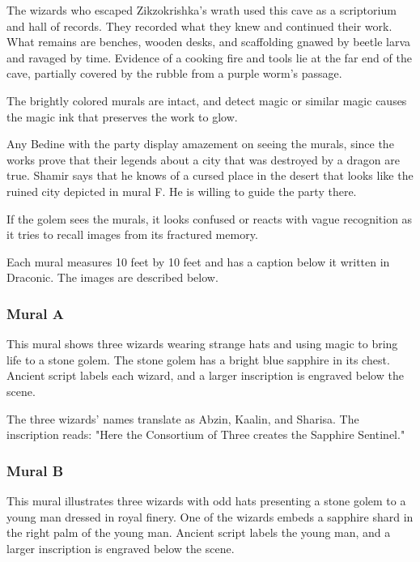 \documentclass[10pt,a4paper,twoside,bg=print,twocolumn,openany,nodeprecatedcode]{dndbook}
\begin{document}
The wizards who escaped Zikzokrishka's wrath used this cave as a scriptorium and hall of records. They recorded what they knew and continued their work. What remains are benches, wooden desks, and scaffolding gnawed by beetle larva and ravaged by time. Evidence of a cooking fire and tools lie at the far end of the cave, partially covered by the rubble from a purple worm's passage.

The brightly colored murals are intact, and detect magic or similar magic causes the magic ink that preserves the work to glow.

Any Bedine with the party display amazement on seeing the murals, since the works prove that their legends about a city that was destroyed by a dragon are true. Shamir says that he knows of a cursed place in the desert that looks like the ruined city depicted in mural F. He is willing to guide the party there.

If the golem sees the murals, it looks confused or reacts with vague recognition as it tries to recall images from its fractured memory.

Each mural measures 10 feet by 10 feet and has a caption below it written in Draconic. The images are described below.

\subsubsection{Mural A}
\begin{DndReadAloud}{}
This mural shows three wizards wearing strange hats and using magic to bring life to a stone golem. The stone golem has a bright blue sapphire in its chest. Ancient script labels each wizard, and a larger inscription is engraved below the scene.

\end{DndReadAloud}

The three wizards' names translate as Abzin, Kaalin, and Sharisa. The inscription reads: "Here the Consortium of Three creates the Sapphire Sentinel."

\subsubsection{Mural B}
\begin{DndReadAloud}{}
This mural illustrates three wizards with odd hats presenting a stone golem to a young man dressed in royal finery. One of the wizards embeds a sapphire shard in the right palm of the young man. Ancient script labels the young man, and a larger inscription is engraved below the scene.

\end{DndReadAloud}
\end{document}
